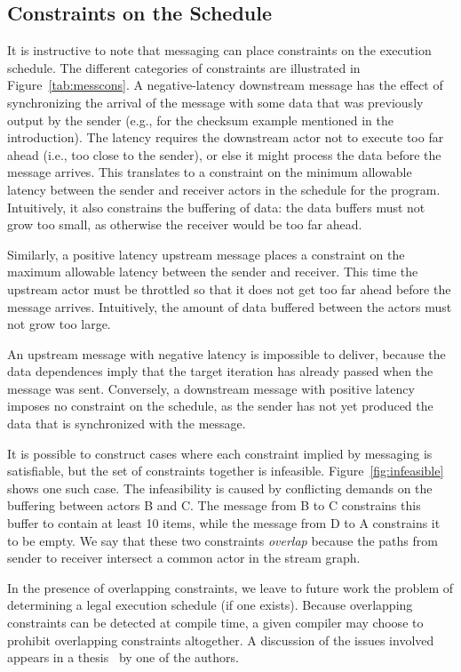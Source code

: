 \subsection{Constraints on the Schedule}
\label{sec:constraints}

It is instructive to note that messaging can place constraints on the
execution schedule.  The different categories of constraints are
illustrated in Figure~\ref{tab:messcons}.  A negative-latency
downstream message has the effect of synchronizing the arrival of the
message with some data that was previously output by the sender (e.g.,
for the checksum example mentioned in the introduction).  The latency
requires the downstream actor not to execute too far ahead (i.e., too
close to the sender), or else it might process the data before the
message arrives.  This translates to a constraint on the minimum
allowable latency between the sender and receiver actors in the
schedule for the program.  Intuitively, it also constrains the
buffering of data: the data buffers must not grow too small, as
otherwise the receiver would be too far ahead.

Similarly, a positive latency upstream message places a constraint on
the maximum allowable latency between the sender and receiver.  This
time the upstream actor must be throttled so that it does not get too
far ahead before the message arrives.  Intuitively, the amount of data
buffered between the actors must not grow too large.

An upstream message with negative latency is impossible to deliver,
because the data dependences imply that the target iteration has
already passed when the message was sent.  Conversely, a downstream
message with positive latency imposes no constraint on the schedule,
as the sender has not yet produced the data that is synchronized with
the message.

It is possible to construct cases where each constraint implied by
messaging is satisfiable, but the set of constraints together is
infeasible.  Figure~\ref{fig:infeasible} shows one such
case.  The infeasibility is caused by conflicting demands on the
buffering between actors B and C.  The message from B to C constrains
this buffer to contain at least 10 items, while the message from D to
A constrains it to be empty.  We say that these two constraints {\it
overlap} because the paths from sender to receiver intersect a common
actor in the stream graph.  

In the presence of overlapping constraints, we leave to future work
the problem of determining a legal execution schedule (if one exists).
Because overlapping constraints can be detected at compile time, a
given compiler may choose to prohibit overlapping constraints
altogether.  A discussion of the issues involved appears in a
thesis~\cite{karczma-thesis} by one of the authors.

